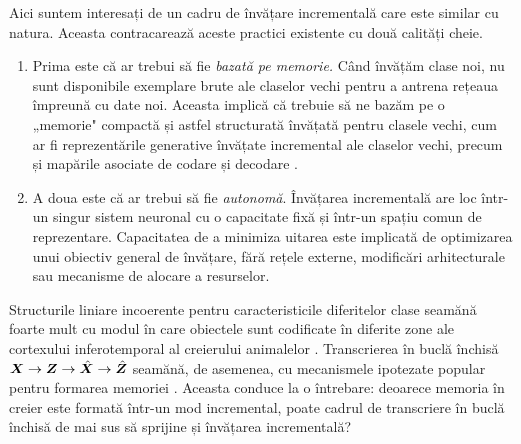 \documentclass[../../book-main_ro.tex]{subfiles}
\begin{document}
Aici suntem interesați de un cadru de învățare incrementală care este similar cu natura. Aceasta contracarează aceste practici existente cu două calități cheie.
\begin{enumerate}
    \item Prima este că ar trebui să fie \emph{bazată pe memorie.} Când învățăm clase noi, nu sunt disponibile exemplare brute ale claselor vechi pentru a antrena rețeaua împreună cu date noi. Aceasta implică că trebuie să ne bazăm pe o „memorie" compactă și astfel structurată învățată pentru clasele vechi, cum ar fi reprezentările generative învățate incremental ale claselor vechi, precum și mapările asociate de codare și decodare \cite{fearnet}.
    \item A doua este că ar trebui să fie \emph{autonomă}. Învățarea incrementală are loc într-un singur sistem neuronal cu o capacitate fixă și într-un spațiu comun de reprezentare. Capacitatea de a minimiza uitarea este implicată de optimizarea unui obiectiv general de învățare, fără rețele externe, modificări arhitecturale sau mecanisme de alocare a resurselor.
\end{enumerate}

Structurile liniare incoerente pentru caracteristicile diferitelor clase seamănă foarte mult cu modul în care obiectele sunt codificate în diferite zone ale cortexului inferotemporal al creierului animalelor \cite{Chang-Cell-2017,Bao2020AMO}. Transcrierea în buclă închisă $\bm{X} \rightarrow \bm{Z} \rightarrow \hat{\bm{X}} \rightarrow \hat{\bm{Z}}$ seamănă, de asemenea, cu mecanismele ipotezate popular pentru formarea memoriei \cite{2020Vandeven,Josselyn2020MemoryER}. Aceasta conduce la o întrebare: deoarece memoria în creier este formată într-un mod incremental, poate cadrul de transcriere în buclă închisă de mai sus să sprijine și învățarea incrementală?
\end{document}
